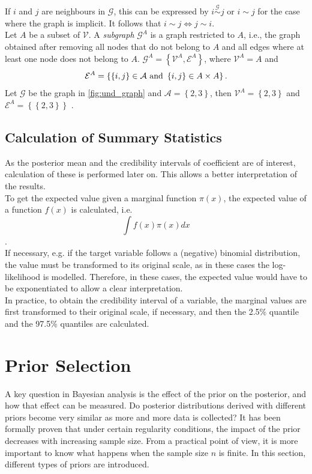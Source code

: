 If $i$ and $j$ are neighbours in $\mathcal{G}$, this can be expressed by $i\overset{\mathcal{G}}{\sim}j$ or $i\sim j$ for the case where the graph is implicit. It follows that $i\sim j\Longleftrightarrow j\sim i$. \\
Let $A$ be a subset of $\mathcal{V}$. A \textit{subgraph} $\mathcal{G}^A$ is a graph restricted to $A$, i.e., the graph obtained after removing all nodes that do not belong to $A$ and all edges where at least one node does not belong to $A$. $\mathcal{G}^A=\left\lbrace\mathcal{V}^A,\mathcal{E}^A\right\rbrace$, where $\mathcal{V}^A=A$ and 
\begin{equation*}
    \mathcal{E}^A = \left\lbrace\left\lbrace i,j\right\rbrace\in\mathcal{A} \hbox{ and } \left\lbrace i,j\right\rbrace\in A\times A\right\rbrace.
\end{equation*}
Let $\mathcal{G}$ be the graph in \autoref{fig:und_graph} and $\mathcal{A}=\left\lbrace2,3\right\rbrace$, then $\mathcal{V}^A=\left\lbrace2,3\right\rbrace$ and $\mathcal{E}^A=\left\lbrace\left\lbrace 2,3\right\rbrace\right\rbrace$ \autocite[][17--18]{rue2005gaussian}.
\subsection{Calculation of Summary Statistics}\label{sec:mean_iv}
As the posterior mean and the credibility intervals of coefficient are of interest, calculation of these is performed later on. This allows a better interpretation of the results. \\
To get the expected value given a marginal function $\pi\left(x\right)$, the expected value of a function $f\left(x\right)$ is calculated, i.e.
\begin{equation}
    \int f\left(x\right)\pi\left(x\right)dx
\end{equation}
\autocite[][]{aitkin1991posterior}.\\
If necessary, e.g. if the target variable follows a (negative) binomial distribution, the value must be transformed to its original scale, as in these cases the log-likelihood is modelled. Therefore, in these cases, the expected value would have to be exponentiated to allow a clear interpretation. \\
In practice, to obtain the credibility interval of a variable, the marginal values are first transformed to their original scale, if necessary, and then the 2.5\% quantile and the 97.5\% quantiles are calculated.
\section{Prior Selection}
A key question in Bayesian analysis is the effect of the prior on the posterior, and how that effect can be measured. Do posterior distributions derived with different priors become very similar as more and more data is collected? It has been formally proven that under certain regularity conditions, the impact of the prior decreases with increasing sample size. From a practical point of view, it is more important to know what happens when the sample size $n$ is finite. In this section, different types of priors are introduced.
